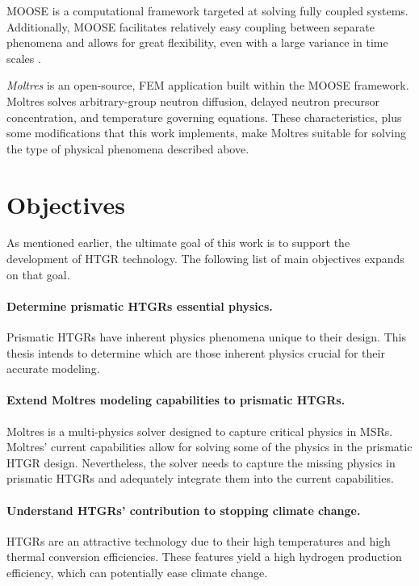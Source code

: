 \gls{MOOSE} \cite{gaston_moose_2009} is a computational framework targeted at solving fully coupled systems.
Additionally, MOOSE facilitates relatively easy coupling between separate phenomena and allows for great flexibility, even with a large variance in time scales \cite{novak_pronghorn_2018}.

\textit{Moltres} is an open-source, \gls{FEM} application built within the \gls{MOOSE} framework.
Moltres solves arbitrary-group neutron diffusion, delayed neutron precursor concentration, and temperature governing equations.
These characteristics, plus some modifications that this work implements, make Moltres suitable for solving the type of physical phenomena described above.

\section{Objectives}

As mentioned earlier, the ultimate goal of this work is to support the development of \gls{HTGR} technology.
The following list of main objectives expands on that goal.

\paragraph{Determine prismatic \glspl{HTGR} essential physics.}
Prismatic HTGRs have inherent physics phenomena unique to their design.
This thesis intends to determine which are those inherent physics crucial for their accurate modeling.

\paragraph{Extend Moltres modeling capabilities to prismatic \glspl{HTGR}.}
Moltres is a multi-physics solver designed to capture critical physics in \glspl{MSR}.
Moltres' current capabilities allow for solving some of the physics in the prismatic HTGR design.
Nevertheless, the solver needs to capture the missing physics in prismatic HTGRs and adequately integrate them into the current capabilities.

\paragraph{Understand HTGRs' contribution to stopping climate change.}
HTGRs are an attractive technology due to their high temperatures and high thermal conversion efficiencies.
These features yield a high hydrogen production efficiency, which can potentially ease climate change.

